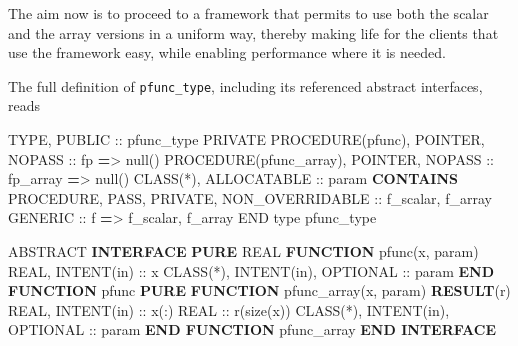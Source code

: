 \documentclass[
]{scrartcl}
\newenvironment{Shaded}{}{}
\newcommand{\DataTypeTok}[1]{\textcolor[rgb]{0.56,0.13,0.00}{#1}}
\newcommand{\FunctionTok}[1]{\textcolor[rgb]{0.02,0.16,0.49}{#1}}
\newcommand{\KeywordTok}[1]{\textcolor[rgb]{0.00,0.44,0.13}{\textbf{#1}}}
\newcommand{\NormalTok}[1]{#1}
\newcommand{\OperatorTok}[1]{\textcolor[rgb]{0.40,0.40,0.40}{#1}}
\begin{document}
The aim now is to proceed to a framework that permits to use both the
scalar and the array versions in a uniform way, thereby making life for
the clients that use the framework easy, while enabling performance
where it is needed.

The full definition of \texttt{pfunc\_type}, including its referenced
abstract interfaces, reads

\begin{Shaded}
\begin{Highlighting}[]
\DataTypeTok{TYPE}\NormalTok{, }\DataTypeTok{PUBLIC} \DataTypeTok{::}\NormalTok{ pfunc\_type}
   \DataTypeTok{PRIVATE}
   \DataTypeTok{PROCEDURE(pfunc)}\NormalTok{, }\DataTypeTok{POINTER}\NormalTok{, }\DataTypeTok{NOPASS} \DataTypeTok{::}\NormalTok{ fp }\KeywordTok{=}\OperatorTok{\textgreater{}}\NormalTok{ null()}
   \DataTypeTok{PROCEDURE(pfunc\_array)}\NormalTok{, }\DataTypeTok{POINTER}\NormalTok{, }\DataTypeTok{NOPASS} \DataTypeTok{::}\NormalTok{ fp\_array }\KeywordTok{=}\OperatorTok{\textgreater{}}\NormalTok{ null()}
   \DataTypeTok{CLASS(*)}\NormalTok{, }\DataTypeTok{ALLOCATABLE} \DataTypeTok{::}\NormalTok{ param}
\KeywordTok{CONTAINS}
   \DataTypeTok{PROCEDURE}\NormalTok{, }\DataTypeTok{PASS}\NormalTok{, }\DataTypeTok{PRIVATE}\NormalTok{, }\DataTypeTok{NON\_OVERRIDABLE} \DataTypeTok{::}\NormalTok{ f\_scalar, f\_array}
   \DataTypeTok{GENERIC} \DataTypeTok{::}\NormalTok{ f }\KeywordTok{=}\OperatorTok{\textgreater{}}\NormalTok{ f\_scalar, f\_array}
\DataTypeTok{END type}\NormalTok{ pfunc\_type}

\DataTypeTok{ABSTRACT} \KeywordTok{INTERFACE}
   \KeywordTok{PURE} \DataTypeTok{REAL} \KeywordTok{FUNCTION}\NormalTok{ pfunc(x, param)}
      \DataTypeTok{REAL}\NormalTok{, }\DataTypeTok{INTENT(in)} \DataTypeTok{::}\NormalTok{ x}
      \DataTypeTok{CLASS(*)}\NormalTok{, }\DataTypeTok{INTENT(in)}\NormalTok{, }\DataTypeTok{OPTIONAL} \DataTypeTok{::}\NormalTok{ param}
   \KeywordTok{END FUNCTION}\NormalTok{ pfunc}
   \KeywordTok{PURE} \KeywordTok{FUNCTION}\NormalTok{ pfunc\_array(x, param) }\KeywordTok{RESULT}\NormalTok{(r)}
      \DataTypeTok{REAL}\NormalTok{, }\DataTypeTok{INTENT(in)} \DataTypeTok{::}\NormalTok{ x(:)}
      \DataTypeTok{REAL} \DataTypeTok{::}\NormalTok{ r(}\FunctionTok{size}\NormalTok{(x))}
      \DataTypeTok{CLASS(*)}\NormalTok{, }\DataTypeTok{INTENT(in)}\NormalTok{, }\DataTypeTok{OPTIONAL} \DataTypeTok{::}\NormalTok{ param}
   \KeywordTok{END FUNCTION}\NormalTok{ pfunc\_array}
\KeywordTok{END INTERFACE}
\end{Highlighting}
\end{Shaded}
\end{document}
